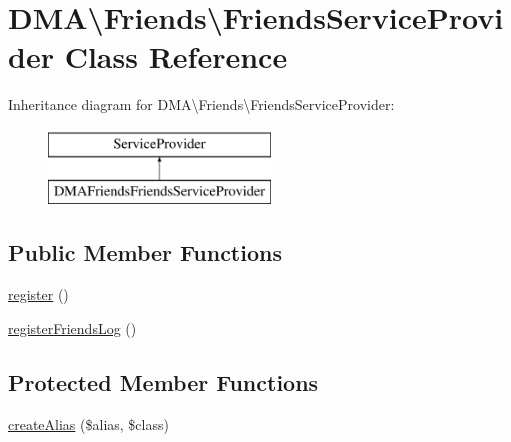 \hypertarget{classDMA_1_1Friends_1_1FriendsServiceProvider}{\section{D\+M\+A\textbackslash{}Friends\textbackslash{}Friends\+Service\+Provider Class Reference}
\label{classDMA_1_1Friends_1_1FriendsServiceProvider}
}
Inheritance diagram for D\+M\+A\textbackslash{}Friends\textbackslash{}Friends\+Service\+Provider\+:\begin{figure}[H]
\begin{center}
\leavevmode
\includegraphics[height=2.000000cm]{df/d6d/classDMA_1_1Friends_1_1FriendsServiceProvider}
\end{center}
\end{figure}
\subsection*{Public Member Functions}
\begin{DoxyCompactItemize}
\item 
\hyperlink{classDMA_1_1Friends_1_1FriendsServiceProvider_a6a90d2cdc4c6b153b45764ba66e154ae}{register} ()
\item 
\hyperlink{classDMA_1_1Friends_1_1FriendsServiceProvider_a2d6ff7101ca6389c00e298f2d594a1df}{register\+Friends\+Log} ()
\end{DoxyCompactItemize}
\subsection*{Protected Member Functions}
\begin{DoxyCompactItemize}
\item 
\hyperlink{classDMA_1_1Friends_1_1FriendsServiceProvider_acad52dc5020c640afed3c4fe82243051}{create\+Alias} (\$alias, \$class)
\end{DoxyCompactItemize}


